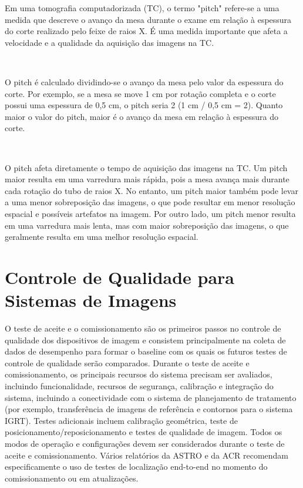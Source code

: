 \documentclass[11pt,a4paper]{article}
\newcounter{exemplo}
\begin{document}
    \begin{tcolorbox}[width=\textwidth, colback={white}, colbacktitle={DarkTurquoise!50!white}, title={$\bigstar$ \LobsterTwo{Pitch} $\bigstar $}, coltitle={CarnationPink}, colframe={DarkTurquoise}, fonttitle=\rmfamily\bfseries\Large]
        Em uma tomografia computadorizada (TC), o termo "pitch" refere-se a uma medida que descreve o avanço da mesa durante o exame em relação à espessura do corte realizado pelo feixe de raios X. É uma medida importante que afeta a velocidade e a qualidade da aquisição das imagens na TC.

        \

        O pitch é calculado dividindo-se o avanço da mesa pelo valor da espessura do corte. Por exemplo, se a mesa se move 1 cm por rotação completa e o corte possui uma espessura de 0,5 cm, o pitch seria 2 (1 cm / 0,5 cm = 2). Quanto maior o valor do pitch, maior é o avanço da mesa em relação à espessura do corte.

        \

        O pitch afeta diretamente o tempo de aquisição das imagens na TC. Um pitch maior resulta em uma varredura mais rápida, pois a mesa avança mais durante cada rotação do tubo de raios X. No entanto, um pitch maior também pode levar a uma menor sobreposição das imagens, o que pode resultar em menor resolução espacial e possíveis artefatos na imagem. Por outro lado, um pitch menor resulta em uma varredura mais lenta, mas com maior sobreposição das imagens, o que geralmente resulta em uma melhor resolução espacial.
    \end{tcolorbox}

\section{Controle de Qualidade para Sistemas de Imagens}

    O teste de aceite e o comissionamento são os primeiros passos no controle de qualidade dos dispositivos de imagem e consistem principalmente na coleta de dados de desempenho para formar o baseline com os quais os futuros testes de controle de qualidade serão comparados. Durante o teste de aceite e comissionamento, os principais recursos do sistema precisam ser avaliados, incluindo funcionalidade, recursos de segurança, calibração e integração do sistema, incluindo a conectividade com o sistema de planejamento de tratamento (por exemplo, transferência de imagens de referência e contornos para o sistema IGRT). Testes adicionais incluem calibração geométrica, teste de posicionamento/reposicionamento e testes de qualidade de imagem. Todos os modos de operação e configurações devem ser considerados durante o teste de aceite e comissionamento. Vários relatórios da ASTRO e da ACR recomendam especificamente o uso de testes de localização end-to-end no momento do comissionamento ou em atualizações.
\end{document}
